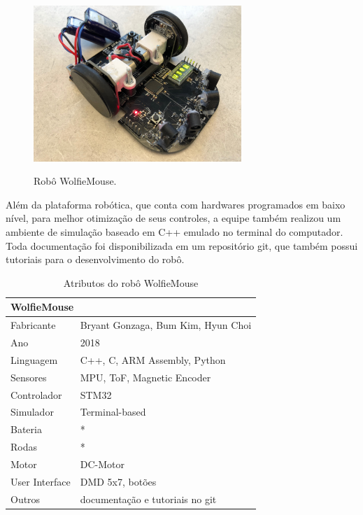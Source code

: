 \begin{figure}[H]
	\centering
	\caption{Robô WolfieMouse.}
	\includegraphics[width=0.7\textwidth]
	{Figures/WolfieMouse_model.jpg}
	\label{fig:WolfieMouse_model}
\end{figure}

\hspace{0.5cm} Além da plataforma robótica, que conta com hardwares programados em baixo nível, para melhor otimização de seus controles, a equipe também realizou um ambiente de simulação baseado em C++ emulado no terminal do computador. Toda documentação foi disponibilizada em um repositório git, que também possui tutoriais para o desenvolvimento do robô.

\begin{table}[H]
	\centering
	\caption{Atributos do robô WolfieMouse}
	\begin{tabular}{|l|l|}
		\hline
		\multicolumn{2}{|l|}{\textbf{WolfieMouse}} \\ \hline
		Fabricante & Bryant Gonzaga, Bum Kim, Hyun Choi \\ \hline
		Ano & 2018 \\ \hline
		Linguagem & C++, C, ARM Assembly, Python \\ \hline
		Sensores & MPU, ToF, Magnetic Encoder \\ \hline
		Controlador & STM32 \\ \hline
		Simulador & Terminal-based \\ \hline
		Bateria & * \\ \hline
		Rodas & * \\ \hline
		Motor & DC-Motor \\ \hline
		User Interface & DMD 5x7, botões \\ \hline
		Outros & documentação e tutoriais no git \\ \hline
	\end{tabular}
	\label{tab:WolfieMouse}
\end{table}

